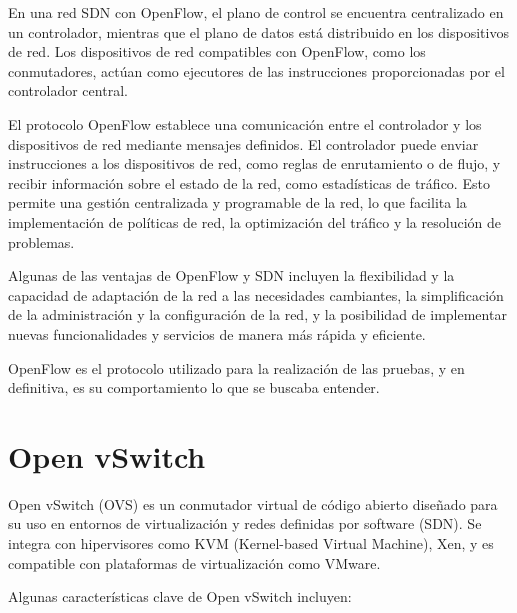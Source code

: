 \documentclass[a4paper, 12pt]{book}
\begin{document}
	En una red SDN con OpenFlow, el plano de control se encuentra centralizado en un controlador, mientras que el plano de datos está distribuido en los dispositivos de red. Los dispositivos de red compatibles con OpenFlow, como los conmutadores, actúan como ejecutores de las instrucciones proporcionadas por el controlador central.
	
	El protocolo OpenFlow establece una comunicación entre el controlador y los dispositivos de red mediante mensajes definidos. El controlador puede enviar instrucciones a los dispositivos de red, como reglas de enrutamiento o de flujo, y recibir información sobre el estado de la red, como estadísticas de tráfico. Esto permite una gestión centralizada y programable de la red, lo que facilita la implementación de políticas de red, la optimización del tráfico y la resolución de problemas.
	
	Algunas de las ventajas de OpenFlow y SDN incluyen la flexibilidad y la capacidad de adaptación de la red a las necesidades cambiantes, la simplificación de la administración y la configuración de la red, y la posibilidad de implementar nuevas funcionalidades y servicios de manera más rápida y eficiente.
	
	OpenFlow es el protocolo utilizado para la realización de las pruebas, y en definitiva, es su comportamiento lo que se buscaba entender.
	
	\section{Open vSwitch} 
	\label{sec:vswitch}
	
	Open vSwitch (OVS) es un conmutador virtual de código abierto diseñado para su uso en entornos de virtualización y redes definidas por software (SDN). Se integra con hipervisores como KVM (Kernel-based Virtual Machine), Xen, y es compatible con plataformas de virtualización como VMware.
	
	Algunas características clave de Open vSwitch incluyen:
	
\end{document}
